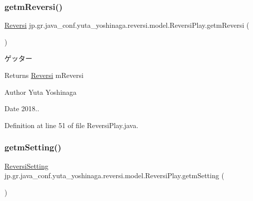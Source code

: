\subsubsection{\texorpdfstring{getm\+Reversi()}{getmReversi()}}
{\footnotesize\ttfamily \hyperlink{classjp_1_1gr_1_1java__conf_1_1yuta__yoshinaga_1_1reversi_1_1model_1_1_reversi}{Reversi} jp.\+gr.\+java\+\_\+conf.\+yuta\+\_\+yoshinaga.\+reversi.\+model.\+Reversi\+Play.\+getm\+Reversi (\begin{DoxyParamCaption}{ }\end{DoxyParamCaption})}



ゲッター 

\begin{DoxyReturn}{Returns}
\hyperlink{classjp_1_1gr_1_1java__conf_1_1yuta__yoshinaga_1_1reversi_1_1model_1_1_reversi}{Reversi} m\+Reversi 
\end{DoxyReturn}
\begin{DoxyAuthor}{Author}
Yuta Yoshinaga 
\end{DoxyAuthor}
\begin{DoxyDate}{Date}
2018.. 
\end{DoxyDate}


Definition at line 51 of file Reversi\+Play.\+java.

\mbox{\label{classjp_1_1gr_1_1java__conf_1_1yuta__yoshinaga_1_1reversi_1_1model_1_1_reversi_play_a7190dc24d3704caf7a3c0e3c31ca69de}} 
\subsubsection{\texorpdfstring{getm\+Setting()}{getmSetting()}}
{\footnotesize\ttfamily \hyperlink{classjp_1_1gr_1_1java__conf_1_1yuta__yoshinaga_1_1reversi_1_1model_1_1_reversi_setting}{Reversi\+Setting} jp.\+gr.\+java\+\_\+conf.\+yuta\+\_\+yoshinaga.\+reversi.\+model.\+Reversi\+Play.\+getm\+Setting (\begin{DoxyParamCaption}{ }\end{DoxyParamCaption})}



